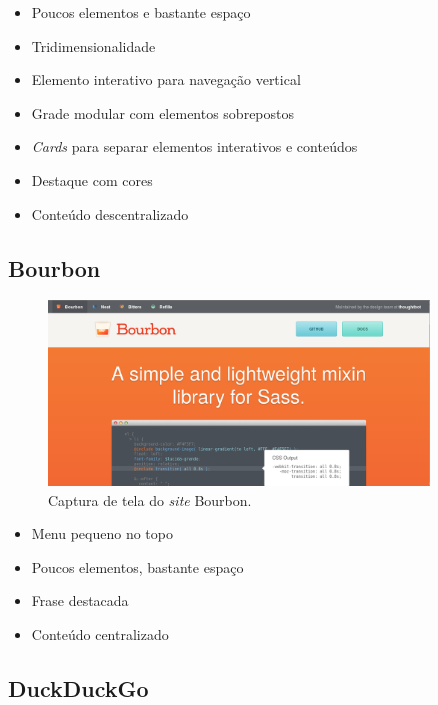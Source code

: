 \begin{itemize}
\tightlist
\item
  Poucos elementos e bastante espaço
\item
  Tridimensionalidade
\item
  Elemento interativo para navegação vertical
\item
  Grade modular com elementos sobrepostos
\item
  \emph{Cards} para separar elementos interativos e conteúdos
\item
  Destaque com cores
\item
  Conteúdo descentralizado
\end{itemize}

\subsection{Bourbon}\label{bourbon}

\begin{figure}[!htbp]
\centering
\caption{\label{fig-bourbon}Captura de tela do \emph{site} Bourbon.}
\includegraphics[width=0.9\textwidth]{images/tendencias/bourbon.png}
\end{figure}

\begin{itemize}
\tightlist
\item
  Menu pequeno no topo
\item
  Poucos elementos, bastante espaço
\item
  Frase destacada
\item
  Conteúdo centralizado
\end{itemize}

\subsection{DuckDuckGo}\label{duckduckgo}


